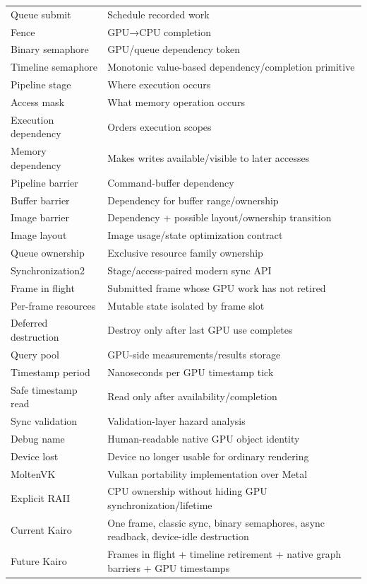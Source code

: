 {\begin{longtable}[]{@{}
  >{\raggedright\arraybackslash}p{}
  >{\raggedright\arraybackslash}p{}@{}}
Queue submit & Schedule recorded work \\
Fence & GPU→CPU completion \\
Binary semaphore & GPU/queue dependency token \\
Timeline semaphore & Monotonic value-based dependency/completion primitive \\
Pipeline stage & Where execution occurs \\
Access mask & What memory operation occurs \\
Execution dependency & Orders execution scopes \\
Memory dependency & Makes writes available/visible to later accesses \\
Pipeline barrier & Command-buffer dependency \\
Buffer barrier & Dependency for buffer range/ownership \\
Image barrier & Dependency + possible layout/ownership transition \\
Image layout & Image usage/state optimization contract \\
Queue ownership & Exclusive resource family ownership \\
Synchronization2 & Stage/access-paired modern sync API \\
Frame in flight & Submitted frame whose GPU work has not retired \\
Per-frame resources & Mutable state isolated by frame slot \\
Deferred destruction & Destroy only after last GPU use completes \\
Query pool & GPU-side measurements/results storage \\
Timestamp period & Nanoseconds per GPU timestamp tick \\
Safe timestamp read & Read only after availability/completion \\
Sync validation & Validation-layer hazard analysis \\
Debug name & Human-readable native GPU object identity \\
Device lost & Device no longer usable for ordinary rendering \\
MoltenVK & Vulkan portability implementation over Metal \\
Explicit RAII & CPU ownership without hiding GPU synchronization/lifetime \\
Current Kairo & One frame, classic sync, binary semaphores, async readback, device-idle destruction \\
Future Kairo & Frames in flight + timeline retirement + native graph barriers + GPU timestamps \\
\end{longtable}
}

